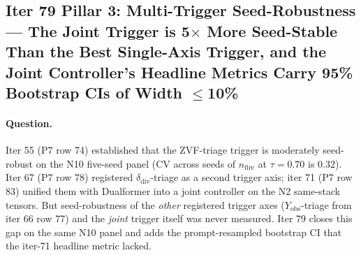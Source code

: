 \subsection{Iter 79 Pillar 3: Multi-Trigger Seed-Robustness ---
              The Joint Trigger is 5$\times$ More Seed-Stable Than
              the Best Single-Axis Trigger, and the Joint Controller's
              Headline Metrics Carry 95\% Bootstrap CIs of Width $\leq$10\%}
\label{sec:p7-iter79-multitrigger}

\paragraph{Question.}
Iter 55 (P7 row 74) established that the ZVF-triage trigger is
moderately seed-robust on the N10 five-seed panel (CV across seeds of
$n_{\mathrm{fire}}$ at $\tau{=}0.70$ is $0.32$).  Iter 67 (P7 row 78)
registered $\delta_{\mathrm{div}}$-triage as a second trigger axis;
iter 71 (P7 row 83) unified them with Dualformer into a joint
controller on the N2 same-stack tensors.  But seed-robustness of the
\emph{other} registered trigger axes ($Y_{\mathrm{obs}}$-triage from
iter 66 row 77) and the \emph{joint} trigger itself was never
measured.  Iter 79 closes this gap on the same N10 panel and adds
the prompt-resampled bootstrap CI that the iter-71 headline metric
lacked.

